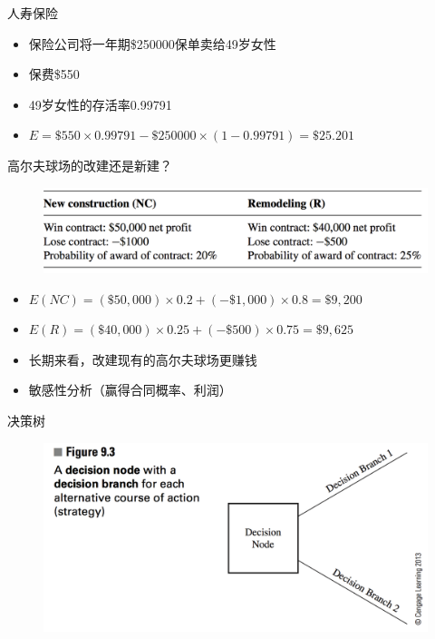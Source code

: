 \documentclass[mathserif, table]{beamer}
\begin{document}
\begin{frame}{人寿保险}

  \begin{itemize}
  \item<1-> 保险公司将一年期\$250000保单卖给49岁女性
  \item<1-> 保费\$550
  \item<1-> 49岁女性的存活率0.99791
  \item<2-> $E = \$550 \times 0.99791 - \$250000 \times (1 - 0.99791) = \$25.201$
  \end{itemize}
  
\end{frame}

\begin{frame}{高尔夫球场的改建还是新建？}

  \begin{figure}
    \centering
    \includegraphics[width=\textwidth{}]{golf.png}
  \end{figure}
  
  \begin{itemize}
  \item<2-> $E(NC) = (\$50,000) \times 0.2 + (-\$1,000) \times 0.8 = \$9,200$
  \item<3-> $E(R) = (\$40,000) \times 0.25 + (-\$500) \times 0.75 = \$9,625$
  \item<4-> 长期来看，改建现有的高尔夫球场更赚钱
  \item<5-> 敏感性分析（赢得合同概率、利润）
  \end{itemize}
  
\end{frame}

\begin{frame}{决策树}
  
  \begin{figure}
    \centering
    \includegraphics[width=\textwidth{}]{9_3.png}
  \end{figure}
  
\end{frame}
\end{document}
